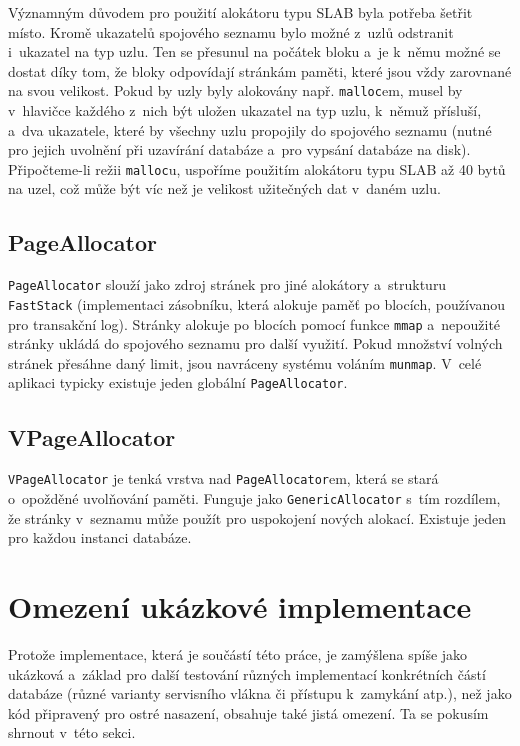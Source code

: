Významným důvodem pro použití
alokátoru typu SLAB byla potřeba šetřit místo.
Kromě ukazatelů spojového seznamu bylo možné z~uzlů odstranit i~ukazatel na
typ uzlu. Ten se přesunul na počátek bloku a~je k~němu možné se dostat díky tom,
že bloky odpovídají stránkám paměti, které jsou vždy zarovnané na svou velikost.
Pokud by uzly byly alokovány např. \verb|malloc|em, musel by v~hlavičce každého
z~nich být uložen ukazatel na typ uzlu, k~němuž přísluší, a~dva ukazatele, které
by všechny uzlu propojily do spojového seznamu (nutné pro jejich uvolnění
při uzavírání databáze a~pro vypsání databáze na disk). Připočteme-li režii
\verb|malloc|u, uspoříme použitím
alokátoru typu SLAB až 40 bytů na uzel, což
může být víc než je velikost užitečných dat v~daném uzlu.

\subsection{PageAllocator}
\verb|PageAllocator| slouží jako zdroj stránek pro jiné alokátory a~strukturu
\verb|FastStack| (implementaci zásobníku, která alokuje paměť po blocích, používanou
pro transakční log).
Stránky alokuje po blocích pomocí funkce \verb|mmap| a~nepoužité
stránky ukládá do spojového seznamu pro další využití. Pokud množství volných
stránek přesáhne daný limit, jsou navráceny systému voláním \verb|munmap|.
V~celé aplikaci typicky existuje jeden globální \verb|PageAllocator|.

\subsection{VPageAllocator}
\verb|VPageAllocator| je tenká vrstva
nad \verb|PageAllocator|em, která se stará o~opožděné
uvolňování paměti. Funguje jako \verb|GenericAllocator| s~tím
rozdílem, že stránky v~seznamu může použít pro uspokojení nových alokací.
Existuje jeden pro každou instanci databáze.




\section{Omezení ukázkové implementace}
Protože implementace, která je součástí této práce, je zamýšlena spíše jako
ukázková
a~základ pro další testování různých implementací konkrétních
částí databáze (různé varianty servisního vlákna či přístupu k~zamykání atp.), než
jako kód připravený pro ostré nasazení, obsahuje také jistá omezení. Ta se pokusím
shrnout v~této sekci.


